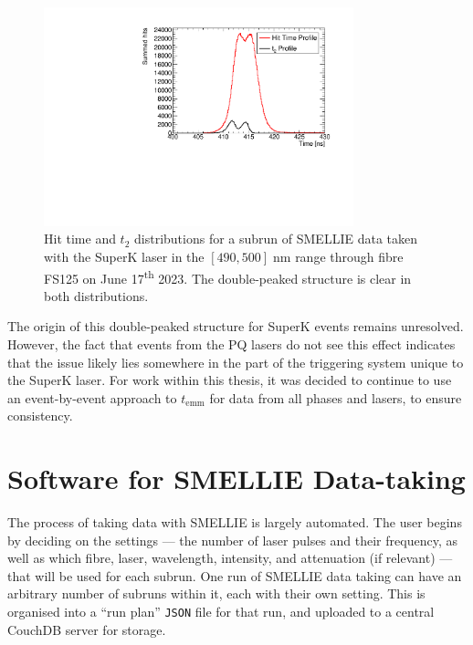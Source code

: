 \begin{figure}
    \centering
    \includegraphics[width=0.8\textwidth]{3_SMELLIEHardware/images/time_t2_plot_310303_SK495_FS125.pdf}
    \caption[]{Hit time and $t_{2}$ distributions for a subrun of SMELLIE data taken with the SuperK laser in the $[490,500]\;\si{\nm}$ range through fibre FS125 on June 17\textsuperscript{th} 2023. The double-peaked structure is clear in both distributions.}
    \label{fig:smellie_superk_double_peaks}
\end{figure}

The origin of this double-peaked structure for SuperK events remains unresolved. However, the fact that events from the PQ lasers do not see this effect indicates that the issue likely lies somewhere in the part of the triggering system unique to the SuperK laser. For work within this thesis, it was decided to continue to use an event-by-event approach to $t_{\mathrm{emm}}$ for data from all phases and lasers, to ensure consistency.


\section{Software for SMELLIE Data-taking}\label{sec:smellie_software}
The process of taking data with SMELLIE is largely automated. The user begins by deciding on the settings --- the number of laser pulses and their frequency, as well as which fibre, laser, wavelength, intensity, and attenuation (if relevant) --- that will be used for each subrun. One run of SMELLIE data taking can have an arbitrary number of subruns within it, each with their own setting. This is organised into a ``run plan'' \texttt{JSON} file for that run, and uploaded to a central CouchDB server for storage.


